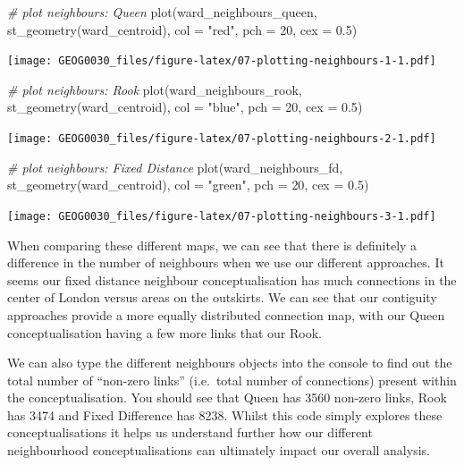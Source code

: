 \documentclass[
]{book}
\newenvironment{Shaded}{\begin{snugshade}}{\end{snugshade}}
\newcommand{\AttributeTok}[1]{\textcolor[rgb]{0.77,0.63,0.00}{#1}}
\newcommand{\CommentTok}[1]{\textcolor[rgb]{0.56,0.35,0.01}{\textit{#1}}}
\newcommand{\DecValTok}[1]{\textcolor[rgb]{0.00,0.00,0.81}{#1}}
\newcommand{\FloatTok}[1]{\textcolor[rgb]{0.00,0.00,0.81}{#1}}
\newcommand{\FunctionTok}[1]{\textcolor[rgb]{0.00,0.00,0.00}{#1}}
\newcommand{\NormalTok}[1]{#1}
\newcommand{\StringTok}[1]{\textcolor[rgb]{0.31,0.60,0.02}{#1}}
\begin{document}
\begin{Shaded}
\begin{Highlighting}[]
\CommentTok{\# plot neighbours: Queen}
\FunctionTok{plot}\NormalTok{(ward\_neighbours\_queen, }\FunctionTok{st\_geometry}\NormalTok{(ward\_centroid), }\AttributeTok{col =} \StringTok{"red"}\NormalTok{, }\AttributeTok{pch =} \DecValTok{20}\NormalTok{,}
    \AttributeTok{cex =} \FloatTok{0.5}\NormalTok{)}
\end{Highlighting}
\end{Shaded}

\texttt{[image: GEOG0030\_files/figure-latex/07-plotting-neighbours-1-1.pdf]}

\begin{Shaded}
\begin{Highlighting}[]
\CommentTok{\# plot neighbours: Rook}
\FunctionTok{plot}\NormalTok{(ward\_neighbours\_rook, }\FunctionTok{st\_geometry}\NormalTok{(ward\_centroid), }\AttributeTok{col =} \StringTok{"blue"}\NormalTok{, }\AttributeTok{pch =} \DecValTok{20}\NormalTok{,}
    \AttributeTok{cex =} \FloatTok{0.5}\NormalTok{)}
\end{Highlighting}
\end{Shaded}

\texttt{[image: GEOG0030\_files/figure-latex/07-plotting-neighbours-2-1.pdf]}

\begin{Shaded}
\begin{Highlighting}[]
\CommentTok{\# plot neighbours: Fixed Distance}
\FunctionTok{plot}\NormalTok{(ward\_neighbours\_fd, }\FunctionTok{st\_geometry}\NormalTok{(ward\_centroid), }\AttributeTok{col =} \StringTok{"green"}\NormalTok{, }\AttributeTok{pch =} \DecValTok{20}\NormalTok{,}
    \AttributeTok{cex =} \FloatTok{0.5}\NormalTok{)}
\end{Highlighting}
\end{Shaded}

\texttt{[image: GEOG0030\_files/figure-latex/07-plotting-neighbours-3-1.pdf]}

When comparing these different maps, we can see that there is definitely a difference in the number of neighbours when we use our different approaches. It seems our fixed distance neighbour conceptualisation has much connections in the center of London versus areas on the outskirts. We can see that our contiguity approaches provide a more equally distributed connection map, with our Queen conceptualisation having a few more links that our Rook.

We can also type the different neighbours objects into the console to find out the total number of ``non-zero links'' (i.e.~total number of connections) present within the conceptualisation. You should see that Queen has 3560 non-zero links, Rook has 3474 and Fixed Difference has 8238. Whilst this code simply explores these conceptualisations it helps us understand further how our different neighbourhood conceptualisations can ultimately impact our overall analysis.
\end{document}
